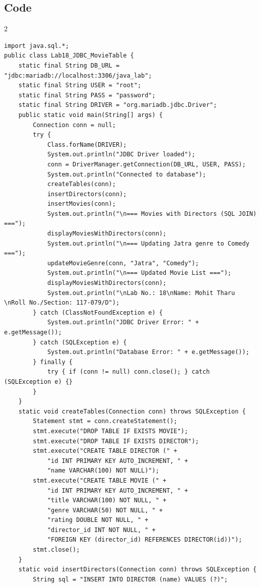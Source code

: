 \documentclass[10pt,a4paper]{article}
\begin{document}
\subsection*{Code}
\begin{multicols}{2}
\begin{lstlisting}
import java.sql.*;
public class Lab18_JDBC_MovieTable {
    static final String DB_URL = "jdbc:mariadb://localhost:3306/java_lab";
    static final String USER = "root";
    static final String PASS = "password";
    static final String DRIVER = "org.mariadb.jdbc.Driver";
    public static void main(String[] args) {
        Connection conn = null;
        try {
            Class.forName(DRIVER);
            System.out.println("JDBC Driver loaded");
            conn = DriverManager.getConnection(DB_URL, USER, PASS);
            System.out.println("Connected to database");
            createTables(conn);
            insertDirectors(conn);
            insertMovies(conn);
            System.out.println("\n=== Movies with Directors (SQL JOIN) ===");
            displayMoviesWithDirectors(conn);
            System.out.println("\n=== Updating Jatra genre to Comedy ===");
            updateMovieGenre(conn, "Jatra", "Comedy");
            System.out.println("\n=== Updated Movie List ===");
            displayMoviesWithDirectors(conn);
            System.out.println("\nLab No.: 18\nName: Mohit Tharu \nRoll No./Section: 117-079/D");
        } catch (ClassNotFoundException e) {
            System.out.println("JDBC Driver Error: " + e.getMessage());
        } catch (SQLException e) {
            System.out.println("Database Error: " + e.getMessage());
        } finally {
            try { if (conn != null) conn.close(); } catch (SQLException e) {}
        }
    }
    static void createTables(Connection conn) throws SQLException {
        Statement stmt = conn.createStatement();
        stmt.execute("DROP TABLE IF EXISTS MOVIE");
        stmt.execute("DROP TABLE IF EXISTS DIRECTOR");
        stmt.execute("CREATE TABLE DIRECTOR (" +
            "id INT PRIMARY KEY AUTO_INCREMENT, " +
            "name VARCHAR(100) NOT NULL)");
        stmt.execute("CREATE TABLE MOVIE (" +
            "id INT PRIMARY KEY AUTO_INCREMENT, " +
            "title VARCHAR(100) NOT NULL, " +
            "genre VARCHAR(50) NOT NULL, " +
            "rating DOUBLE NOT NULL, " +
            "director_id INT NOT NULL, " +
            "FOREIGN KEY (director_id) REFERENCES DIRECTOR(id))");
        stmt.close();
    }
    static void insertDirectors(Connection conn) throws SQLException {
        String sql = "INSERT INTO DIRECTOR (name) VALUES (?)";

\end{lstlisting}
\end{multicols}
\end{document}
